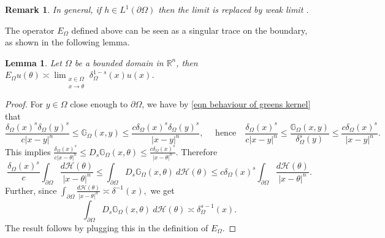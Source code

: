 \documentclass{amsart}
\newtheorem{lemma}[theorem]{Lemma}
\newtheorem{remark}[theorem]{Remark}
\newcommand{\R}{\mathbb{R}}
\newcommand{\gk}[1]{\mathbb{G}_{#1}}
\newcommand{\Ds}{D_{s}}
\begin{document}
\begin{remark}
    In general, if $h\in L^{1}(\partial\Omega)$ then the limit is replaced by weak limit \cite[Theorem 4.15]{AbatangeloVazquez2023}. 
\end{remark}
The operator $E_{\Omega}$ defined above can be seen as a singular trace on the boundary, as shown in the following lemma.
\begin{lemma}\label{lemma equivalent E}
    Let $\Omega$ be a bounded domain in $\R^{n}$, then $E_{\Omega}u(\theta)\asymp \displaystyle\lim_{\substack{x\in \Omega\\ x\to \theta}}\delta_{\Omega}^{1-s}(x)u(x)$.
\end{lemma}
\begin{proof}
   For $y\in \Omega$ close enough to $\partial\Omega$, we have by \eqref{eqn behaviour of greens kernel} that
\begin{equation*}
    \frac{\delta_{\Omega}(x)^{s}\delta_{\Omega}(y)^{s}}{c|x-y|^{n}}\leq \gk{\Omega}(x,y)\leq \frac{c\delta_{\Omega}(x)^{s}\delta_{\Omega}(y)^{s}}{|x-y|^{n}}, \quad \text{ hence} \quad  \frac{\delta_{\Omega}(x)^{s}}{c|x-y|^{n}}\leq \frac{\gk{\Omega}(x,y)}{\delta_{\Omega}^{s}(y)}\leq \frac{c\delta_{\Omega}(x)^{s}}{|x-y|^{n}}.
\end{equation*}
This implies $\displaystyle \frac{\delta_{\Omega}(x)^{s}}{c|x-\theta|^{n}}\leq \Ds \gk{\Omega}(x,\theta)\leq \frac{c\delta_{\Omega}(x)^{s}}{|x-\theta|^{n}}$. 
Therefore 
\begin{equation*}\label{eqn bdy asym of trace}
    \frac{\delta_{\Omega}(x)^{s}}{c}\int_{\partial\Omega}\frac{d\mathcal{H}(\theta)}{|x-\theta|^{n}}\leq \int_{\partial\Omega}\Ds \gk{\Omega}(x,\theta)\ d\mathcal{H}(\theta)\leq c\delta_{\Omega}(x)^{s}\int_{\partial\Omega}\frac{d\mathcal{H}(\theta)}{|x-\theta|^{n}}.
\end{equation*}
Further,  since $\displaystyle \int_{\partial\Omega}\frac{d\mathcal{H}(\theta)}{|x-\theta|^{n}} \asymp \delta^{-1}(x),$ 
we get 
\begin{equation*}
    \int_{\partial\Omega}\Ds \gk{\Omega}(x,\theta)\ d\mathcal{H}(\theta)\asymp \delta_{\Omega}^{s-1}(x).
\end{equation*}
The result follows by plugging this in the definition of $E_{\Omega}$.
\end{proof}
\end{document}
